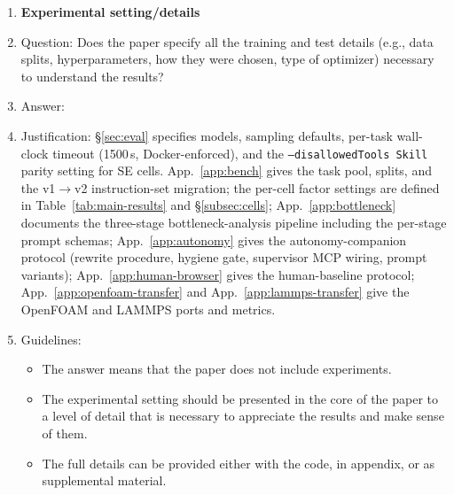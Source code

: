 \begin{enumerate}
\item {\bf Experimental setting/details}
    \item[] Question: Does the paper specify all the training and test details (e.g., data splits, hyperparameters, how they were chosen, type of optimizer) necessary to understand the results?
    \item[] Answer: \answerYes{}
    \item[] Justification: \S\ref{sec:eval} specifies models, sampling defaults, per-task wall-clock timeout (1500\,s, Docker-enforced), and the \texttt{--disallowedTools Skill} parity setting for SE cells. App.~\ref{app:bench} gives the task pool, splits, and the v1$\to$v2 instruction-set migration; the per-cell factor settings are defined in Table~\ref{tab:main-results} and \S\ref{subsec:cells}; App.~\ref{app:bottleneck} documents the three-stage bottleneck-analysis pipeline including the per-stage prompt schemas; App.~\ref{app:autonomy} gives the autonomy-companion protocol (rewrite procedure, hygiene gate, supervisor MCP wiring, prompt variants); App.~\ref{app:human-browser} gives the human-baseline protocol; App.~\ref{app:openfoam-transfer} and App.~\ref{app:lammps-transfer} give the OpenFOAM and LAMMPS ports and metrics.
    \item[] Guidelines:
    \begin{itemize}
        \item The answer \answerNA{} means that the paper does not include experiments.
        \item The experimental setting should be presented in the core of the paper to a level of detail that is necessary to appreciate the results and make sense of them.
        \item The full details can be provided either with the code, in appendix, or as supplemental material.
    \end{itemize}


\end{enumerate}
